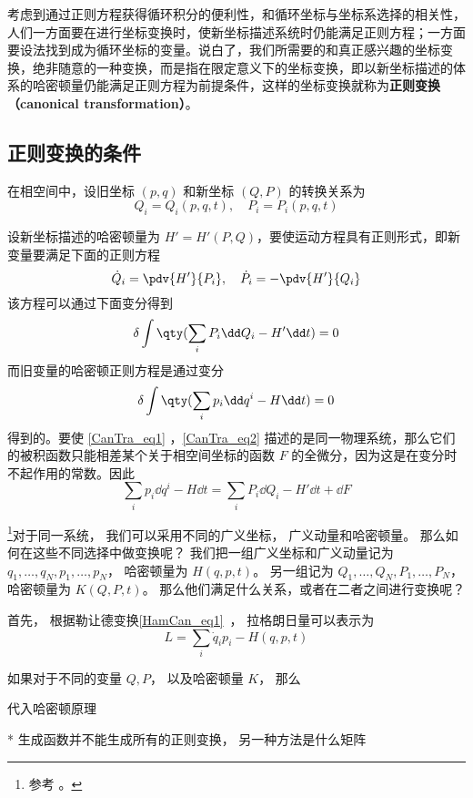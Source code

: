 考虑到通过正则方程获得循环积分的便利性，和循环坐标与坐标系选择的相关性，人们一方面要在进行坐标变换时，使新坐标描述系统时仍能满足正则方程；一方面要设法找到成为循环坐标的变量。说白了，我们所需要的和真正感兴趣的坐标变换，绝非随意的一种变换，而是指在限定意义下的坐标变换，即以新坐标描述的体系的哈密顿量仍能满足正则方程为前提条件，这样的坐标变换就称为\textbf{正则变换（canonical transformation）}。

\subsection{正则变换的条件}
在相空间中，设旧坐标 $(p,q)$ 和新坐标 $(Q,P)$ 的转换关系为
\begin{equation}
Q_i=Q_i(p,q,t),\quad P_i=P_i(p,q,t)
\end{equation}

设新坐标描述的哈密顿量为 $H'=H'(P,Q)$，要使运动方程具有正则形式，即新变量要满足下面的正则方程
\begin{equation}
\dot Q_i=\pdv{H'}{P_i},\quad \dot P_i=-\pdv{H'}{Q_i}
\end{equation}
该方程可以通过下面变分得到
\begin{equation}\label{CanTra_eq1}
\delta\int\qty(\sum_iP_i\dd Q_i-H'\dd t)=0
\end{equation}
而旧变量的哈密顿正则方程是通过变分
\begin{equation}\label{CanTra_eq2}
\delta\int\qty(\sum_ip_i\dd q^i-H\dd t)=0
\end{equation}
得到的。要使 \autoref{CanTra_eq1} ，\autoref{CanTra_eq2} 描述的是同一物理系统，那么它们的被积函数只能相差某个关于相空间坐标的函数 $F$ 的全微分，因为这是在变分时不起作用的常数。因此
\begin{equation}
\sum_ip_i\dd q^i-H\dd t=\sum_iP_i\dd Q_i-H'\dd t+\dd F
\end{equation}





\footnote{参考 \cite{Goldstein}。}对于同一系统， 我们可以采用不同的广义坐标， 广义动量和哈密顿量。 那么如何在这些不同选择中做变换呢？ 我们把一组广义坐标和广义动量记为 $q_1,\dots, q_N, p_1, \dots, p_N$， 哈密顿量为 $H(q, p, t)$。 另一组记为 $Q_1,\dots, Q_N, P_1, \dots, P_N$， 哈密顿量为 $K(Q, P, t)$。 那么他们满足什么关系，或者在二者之间进行变换呢？

首先， 根据勒让德变换\autoref{HamCan_eq1}~， 拉格朗日量可以表示为
\begin{equation}
L = \sum_i \dot q_i p_i - H(q, p, t)
\end{equation}

如果对于不同的变量 $Q, P$， 以及哈密顿量 $K$， 那么

代入哈密顿原理

* 生成函数并不能生成所有的正则变换， 另一种方法是什么矩阵
